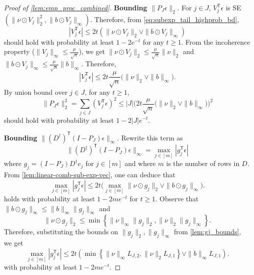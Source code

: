 \documentclass[ejs,noshowframe]{imsart}
\theoremstyle{plain}
\theoremstyle{definition}
\renewcommand{\top}{\mathsf{T}}
\begin{document}
\begin{appendix}
\begin{proof}[Proof of \autoref{lem:emp_proc_combined}]
\textbf{Bounding $\| P_{J} \epsilon \|_2.$}
For $j\in J$, 
$V_j^\top \epsilon$ is SE$(\| \nu \odot V_j \|_2^2, \| b \odot V_j \|_\infty)$.
Therefore, from \eqref{eq:subexp_tail_highprob_bd},
\begin{equation}
|V_j^\top \epsilon| \leq 2t (\| \nu \odot V_j \|_2 \vee \| b \odot V_j 
\|_\infty)
\end{equation}
should hold with probability at least $1-2e^{-t}$ for any $t\geq 1$.
From the incoherence property ($\|V_j \|_\infty \leq \frac{\mu}{\sqrt{n}}$), 
we get
$\| \nu \odot V_j \|_2 \leq \frac{\mu}{\sqrt{n}} \| \nu \|_2$ 
and 
$\| b \odot V_j \|_\infty \leq \frac{\mu}{\sqrt{n}} \|b\|_\infty$.
Therefore,
\begin{equation}
|V_j^\top \epsilon| \leq 2 t \frac{\mu}{\sqrt{n}} \big( \| \nu \|_2 \vee 
\|b\|_\infty \big).
\end{equation}
By union bound over $j\in J$, for any $t\geq 1$,
\begin{equation}
\label{eq:eps_null_proj_bd}
\| P_{J} \epsilon\|_2^2 = \sum_{j\in J} (V_j^\top \epsilon)^2 
\leq 
|J|
\big(2 t \frac{\mu}{\sqrt{n}} \big( \| \nu \|_2 \vee \|b\|_\infty \big)  \big) 
^2
\end{equation}
should hold with probability at least $1-2|J| e^{-t}$.


\textbf{Bounding $\| (D^\dagger)^\top (I-P_{J}) \epsilon\|_\infty.$}
Rewrite this term as
$$
\| (D^\dagger)^\top (I-P_{J}) \epsilon\|_\infty = \max_{j\in[m]} | g_j^\top 
\epsilon |
$$
where $g_j = (I-P_{J}) D^\dagger e_j$ for $j\in[m]$ 
and where $m$ is the number of rows in $D.$
From \autoref{lem:linear-comb-sub-exp-vec}, one can deduce that
\begin{equation}
\max_{j\in[m]} |g_j^\top \epsilon|  \leq 2t \big( \max_{j\in[m]} \| \nu \odot 
g_j 
\|_2 \vee  \| b \odot g_j \|_\infty \big).
\end{equation}
holds with probability at least $1-2m e^{-t}$ for $t\geq 1$. 
Observe that 
$\| b \odot g_j \|_\infty \leq \|b\|_\infty \|g_j\|_\infty$
and 
\begin{equation}
\| \nu \odot g_j \|_2 \leq \min\left\{ \|\nu\|_\infty \|g_j\|_2, \|\nu\|_2 
\|g_j\|_\infty\right\}.
\end{equation}
Therefore, substituting the bounds on $ \|g_j \|_2, \|g_j\|_\infty$ from 
\autoref{lem:gj_bounds}, we get 
\begin{equation}
\max_{j\in[m]} |g_j^\top \epsilon|  \leq 2t  \left( 
	\min\left\{ \|\nu\|_\infty  L_{J,2}, 
					  \|\nu\|_2 L_{J,1} \right\}
	\vee  \| b \|_\infty L_{J,1}\right).
\end{equation}
with probability at least $1-2me^{-t}.$
\end{proof}


\end{appendix}
\end{document}
